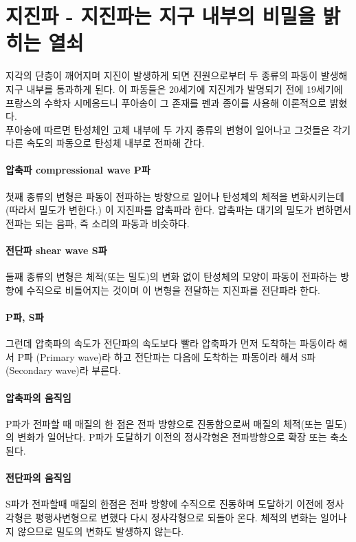 \documentclass[12pt, a4paper, oneside]{book}
\begin{document}
	\clearpage
	\section{지진파 - 지진파는 지구 내부의 비밀을 밝히는 열쇠}

	지각의 단층이 깨어지며 지진이 발생하게 되면 진원으로부터 두 종류의 파동이 발생해 지구 내부를 통과하게 된다.
	이 파동들은 20세기에 지진계가 발명되기 전에 19세기에 프랑스의 수학자 시메옹드니 푸아송이 그 존재를 펜과 종이를 사용해 이론적으로 밝혔다. \\
	
	푸아송에 따르면 탄성체인 고체 내부에 두 가지 종류의 변형이 일어나고 그것들은 각기 다른 속도의 파동으로 탄성체 내부로 전파해 간다.
	
		\paragraph{압축파 compressional wave P파}	
		첫째 종류의 변형은 파동이 전파하는 방향으로 일어나 탄성체의 체적을 변화시키는데(따라서 밀도가 변한다.) 이 지진파를 압축파라 한다. 압축파는 대기의 밀도가 변하면서 전파는 되는 음파, 즉 소리의 파동과 비슷하다.

		\paragraph{전단파 shear wave S파}	
		둘째 종류의 변형은 체적(또는 밀도)의 변화 없이 탄성체의 모양이 파동이 전파하는 방향에 수직으로 비틀어지는 것이며 이 변형을 전달하는 지진파를 전단파라 한다.
		
		\paragraph{P파, S파}	
		그런데 압축파의 속도가 전단파의 속도보다 빨라 압축파가 먼저 도착하는 파동이라 해서 P파 (Primary wave)라 하고 전단파는 다음에 도착하는 파동이라 해서 S파 (Secondary wave)라 부른다.


		\paragraph{압축파의 움직임}	
		P파가 전파할 때 매질의 한 점은 전파 방향으로 진동함으로써 매질의 체적(또는 밀도)의 변화가 일어난다.
		P파가 도달하기 이전의 정사각형은 전파방향으로 확장 또는 축소된다.


		\paragraph{전단파의 움직임}	
		S파가 전파할때 매질의 한점은 전파 방향에 수직으로 진동하며 도달하기 이전에 정사각형은 평행사변형으로 변했다 다시 정사각형으로 되돌아 온다. 체적의 변화는 일어나지 않으므로 밀도의 변화도 발생하지 않는다.
\end{document}
